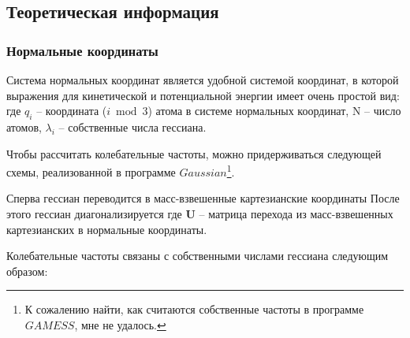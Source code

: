 \subsection{Теоретическая информация}
\subsubsection{Нормальные координаты}
Система нормальных координат является удобной системой координат, в которой выражения для кинетической и потенциальной энергии имеет очень простой вид:
где $q_i$ -- координата ($i \bmod 3$) атома в системе нормальных координат, N -- число атомов, $\lambda_i$ -- собственные числа гессиана. 

Чтобы рассчитать колебательные частоты, можно придерживаться следующей схемы, реализованной в программе $Gaussian$\footnote{К сожалению найти, как считаются собственные частоты в программе $GAMESS$, мне не удалось.}.

Сперва гессиан переводится в масс-взвешенные картезианские координаты
После этого гессиан диагонализируется
где \textbf{U} -- матрица перехода из масс-взвешенных картезианских в нормальные координаты.

Колебательные частоты связаны с собственными числами гессиана следующим образом:
